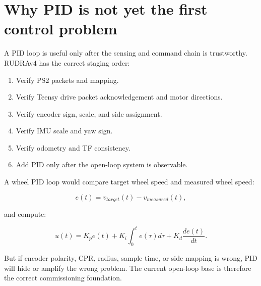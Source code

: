 \section{Why PID is not yet the first control problem}

A PID loop is useful only after the sensing and command chain is trustworthy. RUDRAv4 has the correct staging order:

\begin{enumerate}
  \item Verify PS2 packets and  mapping.
  \item Verify Teensy drive packet acknowledgement and motor directions.
  \item Verify encoder sign, scale, and side assignment.
  \item Verify IMU scale and yaw sign.
  \item Verify odometry and TF consistency.
  \item Add PID only after the open-loop system is observable.
\end{enumerate}

A wheel PID loop would compare target wheel speed and measured wheel speed:

\begin{equation}
e(t)=v_{target}(t)-v_{measured}(t),
\end{equation}

and compute:

\begin{equation}
u(t)=K_p e(t)+K_i\int_0^t e(\tau)d\tau+K_d\frac{de(t)}{dt}.
\end{equation}

But if encoder polarity, CPR, radius, sample time, or side mapping is wrong, PID will hide or amplify the wrong problem. The current open-loop base is therefore the correct commissioning foundation.
